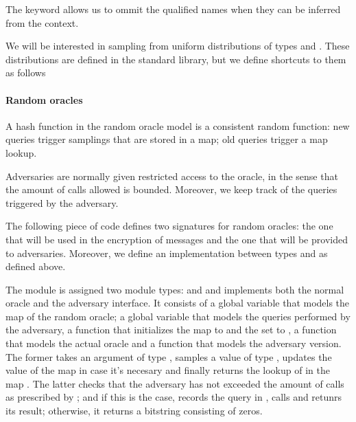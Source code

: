 
The  keyword allows us to ommit the qualified names when
they can be inferred from the context. 

We will be interested in sampling from uniform distributions of types
 and . These distributions are defined in
the standard library, but we define shortcuts to them as follows



\paragraph{Random oracles}
A hash function in the random oracle model is a consistent random
function: new queries trigger samplings that are stored in a map; old
queries trigger a map lookup. 

Adversaries are normally given restricted access to the oracle, in the
sense that the amount of calls allowed is bounded. Moreover, we keep
track of the queries triggered by the adversary. 

The following piece of code defines two signatures for random oracles:
the one that will be used in the encryption of messages and the one
that will be provided to adversaries. Moreover, we define an
implementation between types  and  as
defined above.



The module  is assigned two module types:  and
 and implements both the normal oracle and the adversary
interface. It consists of a global variable  that models the map
of the random oracle; a global variable  that models the queries
performed by the adversary, a function  that initializes the
map to  and the set to , a function  that
models the actual oracle and a function that models the adversary
version. The former takes an argument  of type ,
samples a value  of type , updates the value of
the map in case it's necesary and finally returns the lookup of 
in the map . The latter checks that the adversary has not
exceeded the amount of calls as prescribed by ; and if this is
the case, records the query in , calls  and retunrs its
result; otherwise, it returns a bitstring consisting of zeros.


